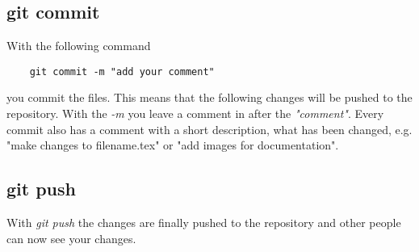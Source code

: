 \documentclass[
	a4paper, %
	10pt, %
	unnumberedsections, %
	twoside, %
	onecolumn,
]{LTJournalArticle}
\begin{document}
\subsection{git commit}
With the following command
\begin{verbatim}
	git commit -m "add your comment"
\end{verbatim}
you commit the files. This means that the following changes will be pushed to the repository. 
With the \emph{-m} you leave a comment in after the \emph{"comment"}. Every commit also has a comment with a short description, what has been changed, e.g. "make changes to filename.tex" or "add images for documentation".

\subsection{git push}
With \emph{git push}  the changes are finally pushed to the repository and other people can now see your changes.


\end{document}
